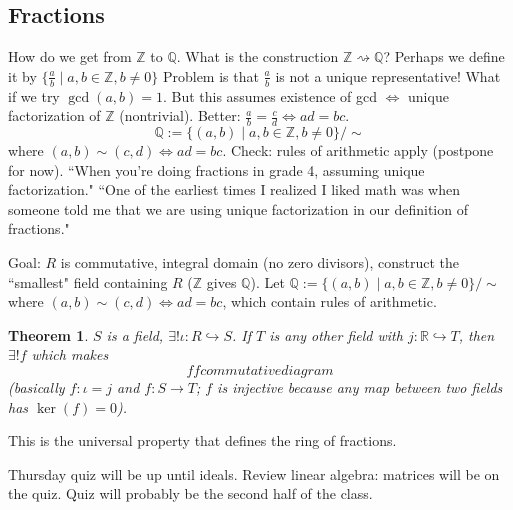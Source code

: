 \documentclass{article}
\theoremstyle{plain}
\newtheorem{theorem}{Theorem}
\theoremstyle{remark}
\newcommand{\Z}{{\mathbb Z}}
\newcommand{\Q}{{\mathbb Q}}
\newcommand{\R}{{\mathbb R}}
\begin{document}
\subsection{Fractions}
How do we get from $\Z$ to $\Q$.
What is the construction $\Z \rightsquigarrow \Q$?
Perhaps we define it by $\{\frac{a}{b} \mid a,b \in \Z, b \neq 0\}$
Problem is that $\frac{a}{b}$ is not a unique representative!
What if we try $\gcd(a,b) = 1$.
But this assumes existence of gcd $\iff $ unique factorization of $\Z$ (nontrivial).
Better: $\frac{a}{b} = \frac{c}{d} \iff ad = bc$.
\[
	\Q := \{(a,b) \mid a,b \in \Z, b \neq 0\}/\sim
\]
where $(a,b) \sim (c,d) \iff ad = bc$.
Check: rules of arithmetic apply (postpone for now).
``When you're doing fractions in grade 4, assuming unique factorization."
``One of the earliest times I realized I liked math
was when someone told me that we are using unique factorization
in our definition of fractions."

Goal: $R$ is commutative, integral domain (no zero divisors),
construct the ``smallest" field containing $R$ ($\Z$ gives $\Q$).
Let $\Q := \{(a,b) \mid a,b \in \Z, b \neq 0\}/\sim$
where $(a,b) \sim (c,d) \iff ad = bc$,
which contain rules of arithmetic.
\begin{theorem}
	$S$ is a field, $\exists! \iota \colon R \hookrightarrow S$.
	If $T$ is any other field with $j \colon \R \hookrightarrow T$,
	then $\exists! f$ which makes
	\[
		ff commutative diagram
	\]
	(basically $f \colon \iota = j$ and $f \colon S \to T$;
	$f$ is injective because any map between two fields has $\ker(f) = 0$).
\end{theorem}
This is the universal property that defines the ring of fractions.

Thursday quiz will be up until ideals.
Review linear algebra: matrices will be on the quiz.
Quiz will probably be the second half of the class.
\end{document}
